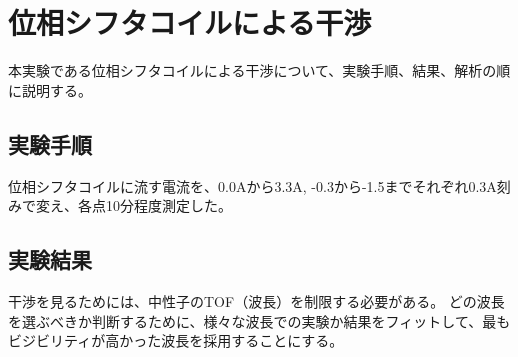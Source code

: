 \begingroup
\def\imgwidth{5.5cm}

\section{位相シフタコイルによる干渉}
本実験である位相シフタコイルによる干渉について、実験手順、結果、解析の順に説明する。

\subsection{実験手順}
位相シフタコイルに流す電流を、0.0Aから3.3A, -0.3から-1.5までそれぞれ0.3A刻みで変え、各点10分程度測定した。

\subsection{実験結果}
干渉を見るためには、中性子のTOF（波長）を制限する必要がある。
どの波長を選ぶべきか判断するために、様々な波長での実験か結果をフィットして、最もビジビリティが高かった波長を採用することにする。

